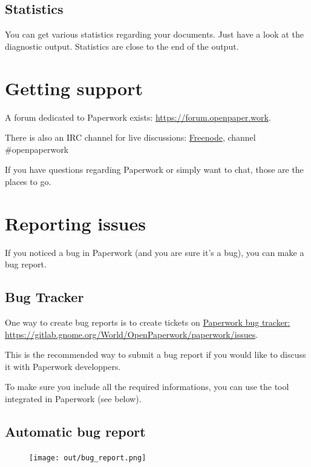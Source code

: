 \documentclass[10pt,a4paper]{article}
\begin{document}
\subsection{Statistics}

You can get various statistics regarding your documents. Just have
a look at the diagnostic output. Statistics are close to the end
of the output.

\section{Getting support}

A forum dedicated to Paperwork exists:
\href{https://forum.openpaper.work}{https://forum.openpaper.work}.

There is also an IRC channel for live discussions:
\href{https://webchat.freenode.net/}{Freenode}, channel \#openpaperwork

If you have questions regarding Paperwork or simply want to chat, those are
the places to go.

\section{Reporting issues}

If you noticed a bug in Paperwork (and you are sure it's a bug), you can
make a bug report.

\subsection{Bug Tracker}

One way to create bug reports is to create tickets on
\href{https://gitlab.gnome.org/World/OpenPaperwork/paperwork/issues}{Paperwork bug tracker: https://gitlab.gnome.org/World/OpenPaperwork/paperwork/issues}.

This is the recommended way to submit a bug report if you would like to discuss
it with Paperwork developpers.

To make sure you include all the required informations, you can use the
tool integrated in Paperwork (see below).


\subsection{Automatic bug report}

\begin{figure}[H]
	\texttt{[image: out/bug\_report.png]}
\end{figure}
\end{document}
